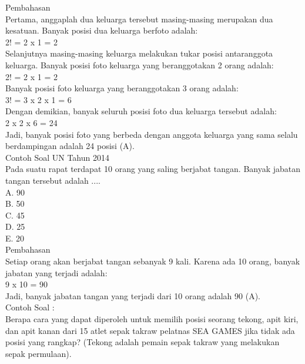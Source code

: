 \documentclass[11pt,fleqn]{book} %
\begin{document}
Pembahasan\\
Pertama, anggaplah dua keluarga tersebut masing-masing merupakan dua kesatuan. Banyak posisi dua keluarga berfoto adalah:\\

2! = 2 x 1 = 2\\

Selanjutnya masing-masing keluarga melakukan tukar posisi antaranggota keluarga. Banyak posisi foto keluarga yang beranggotakan 2 orang adalah:\\

2! = 2 x 1 = 2\\

Banyak posisi foto keluarga yang beranggotakan 3 orang adalah:\\

3! = 3 x 2 x 1 = 6\\

Dengan demikian, banyak seluruh posisi foto dua keluarga tersebut adalah:\\

2 x 2 x 6 = 24\\

Jadi, banyak posisi foto yang berbeda dengan anggota keluarga yang sama selalu berdampingan adalah 24 posisi (A). \\

Contoh Soal UN Tahun 2014 \\
Pada suatu rapat terdapat 10 orang yang saling berjabat tangan. Banyak jabatan tangan tersebut adalah ....\\

A.   90\\
B.   50\\
C.   45\\
D.   25\\
E.   20\\


Pembahasan\\
Setiap orang akan berjabat tangan sebanyak 9 kali. Karena ada 10 orang, banyak jabatan yang terjadi adalah:\\

9 x 10 = 90\\

Jadi, banyak jabatan tangan yang terjadi dari 10 orang  adalah 90 (A).\\


Contoh Soal :\\

Berapa cara yang dapat diperoleh untuk memilih posisi seorang tekong, apit kiri, dan apit kanan dari 15 atlet sepak takraw pelatnas SEA GAMES jika tidak ada posisi yang rangkap? (Tekong adalah pemain sepak takraw yang melakukan sepak permulaan).\\
\end{document}
